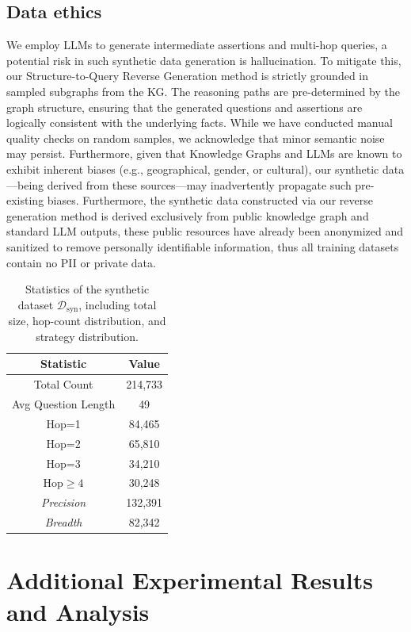 \documentclass[11pt]{article}
\begin{document}
\subsection{Data ethics} 
We employ LLMs to generate intermediate assertions and multi-hop queries, a potential risk in such synthetic data generation is hallucination. To mitigate this, our Structure-to-Query Reverse Generation method is strictly grounded in sampled subgraphs from the KG. The reasoning paths are pre-determined by the graph structure, ensuring that the generated questions and assertions are logically consistent with the underlying facts. While we have conducted manual quality checks on random samples, we acknowledge that minor semantic noise may persist. Furthermore, given that Knowledge Graphs and LLMs are known to exhibit inherent biases (e.g., geographical, gender, or cultural), our synthetic data—being derived from these sources—may inadvertently propagate such pre-existing biases. Furthermore, the synthetic data constructed via our reverse generation method is derived exclusively from public knowledge graph and standard LLM outputs, these public resources have already been anonymized and sanitized to remove personally identifiable information, thus all training datasets contain no PII or private data.

\begin{table}[t]
\centering
\small
\renewcommand{\arraystretch}{1.15} %
\setlength{\tabcolsep}{2.5pt} 

\begin{tabular}{c|c}
\hline
\textbf{Statistic} & \textbf{Value} \\
\hline
Total Count & 214,733 \\
\hline
Avg Question Length & 49 \\
\hline
Hop=1 & 84,465 \\
\hline
Hop=2 & 65,810 \\
\hline
Hop=3 & 34,210 \\
\hline
Hop$\geq 4$ & 30,248 \\
\hline
\textit{Precision} & 132,391 \\
\hline
\textit{Breadth} & 82,342 \\
\hline
\end{tabular}
\caption{Statistics of the synthetic dataset $\mathcal{D}_\text{syn}$, including total size, hop-count distribution, and strategy distribution.}
\label{tab:rgd_stat}
\end{table}

\section{Additional Experimental Results and Analysis}
\label{sec:additional_exp}
\end{document}
